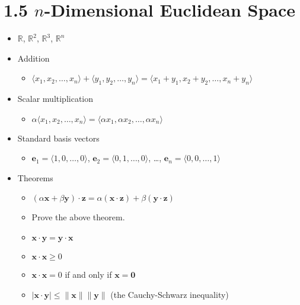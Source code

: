 \documentclass[11pt]{article}
\theoremstyle{plain}
\theoremstyle{definition}
\theoremstyle{remark}
\newcommand{\vect}[1]{\mathbf{#1}}
\newcommand{\<}{\langle}
\renewcommand{\>}{\rangle}
\begin{document}
\section*{1.5 \(n\)-Dimensional Euclidean Space}

\begin{itemize}
  \item \(\mathbb R\), \(\mathbb R^2\), \(\mathbb R^3\), \(\mathbb R^n\)
  \item Addition
    \begin{itemize}
      \item
        \(
          \<x_1,x_2,\dots,x_n\> + \<y_1,y_2,\dots,y_n\>
            =
          \<x_1+y_1,x_2+y_2,\dots,x_n+y_n\>
        \)
    \end{itemize}
  \item Scalar multiplication
    \begin{itemize}
      \item
        \(
          \alpha\<x_1,x_2,\dots,x_n\>
            =
          \<\alpha x_1,\alpha x_2,\dots,\alpha x_n\>
        \)
    \end{itemize}
  \item Standard basis vectors
    \begin{itemize}
      \item
        \(
          \vect{e}_1=\<1,0,\dots,0\>
        \),
        \(
          \vect{e}_2=\<0,1,\dots,0\>
        \), \dots,
        \(
          \vect{e}_n=\<0,0,\dots,1\>
        \)
    \end{itemize}
  \item Theorems
    \begin{itemize}
      \item
        \(
          (\alpha\vect{x}+\beta\vect{y})\cdot\vect{z}
            =
          \alpha(\vect{x}\cdot\vect{z}) + \beta(\vect{y}\cdot\vect{z})
        \)
      \item Prove the above theorem.
      \item
        \(
          \vect{x}\cdot\vect{y}
            =
          \vect{y}\cdot\vect{x}
        \)
      \item
        \(
          \vect{x}\cdot\vect{x} \geq 0
        \)
      \item
        \(
          \vect{x}\cdot\vect{x} = 0
        \)
        if and only if
        \(
          \vect{x}=\vect{0}
        \)
      \item
        \(
          |\vect{x}\cdot\vect{y}|
            \leq
          \|\vect{x}\|\|\vect{y}\|
        \)
        (the Cauchy-Schwarz inequality)

\end{itemize}
\end{itemize}
\end{document}
